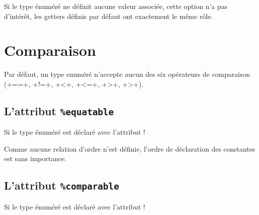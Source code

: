 Si le type énuméré ne définit aucune valeur associée, cette option n'a pas d'intérêt, les getters définis par défaut ont exactement le même rôle.












\section{Comparaison}

Par défaut, un type enuméré n'accepte aucun des six opérateurs de comparaison (\ggsq+==+, \ggsq+!=+, \ggsq+<+, \ggsq+<=+, \ggsq+>+, \ggsq+>+).

\subsection{L'attribut \texttt{\%equatable}}

Si le type énuméré est déclaré avec l'attribut \ggsq!%

Comme aucune relation d'ordre n'est définie, l'ordre de déclaration des constantes est sans importance.




\subsection{L'attribut \texttt{\%comparable}}

Si le type énuméré est déclaré avec l'attribut \ggsq!%


